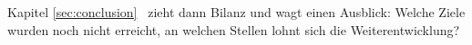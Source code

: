Kapitel \ref{sec:conclusion}~ zieht dann Bilanz und wagt einen Ausblick: Welche Ziele wurden noch nicht erreicht, an welchen Stellen lohnt sich die Weiterentwicklung?


